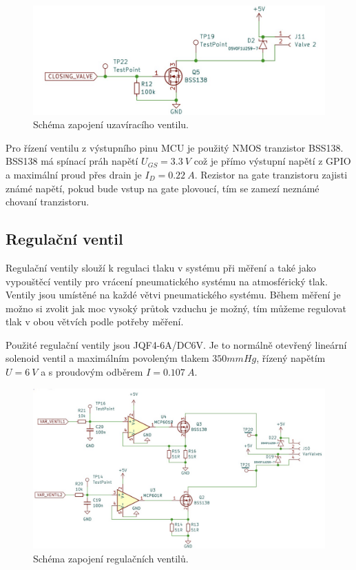 \begin{figure}[H]
    \includegraphics[width=0.9\linewidth]{pictures/closing_valve_driver.jpg}
    \caption{Schéma zapojení uzavíracího ventilu.}
    \label{fig:closing_valve_driver}
\end{figure}

Pro řízení ventilu z výstupního pinu MCU je použitý NMOS tranzistor BSS138. BSS138 má spínací práh napětí $U_{GS} = 3.3 \ V$ což je přímo výstupní napětí z GPIO a maximální proud přes drain je $I_D = 0.22 \ A$.
Rezistor na gate tranzistoru zajisti známé napětí, pokud bude vstup na gate plovoucí, tím se zamezí neznámé chovaní tranzistoru.

\subsection{Regulační ventil}
Regulační ventily slouží k regulaci tlaku v systému při měření a také jako vypouštěcí ventily pro vrácení pneumatického systému na atmosférický tlak. Ventily jsou umístěné na každé větvi pneumatického systému. Během měření je možno si zvolit jak moc vysoký průtok vzduchu je možný, tím můžeme regulovat tlak v obou větvích podle potřeby měření. \par

Použité regulační ventily jsou JQF4-6A/DC6V. Je to normálně otevřený lineární solenoid ventil a maximálním povoleným tlakem $350mmHg$, řízený napětím $U = 6 \ V$ a s proudovým odběrem $I = 0.107 \ A$.\par

\begin{figure}[H]
    \includegraphics[width=1\linewidth]{pictures/var_valves.jpg}
    \caption{Schéma zapojení regulačních ventilů.}
    \label{fig:variable_valve_driver}
\end{figure}

